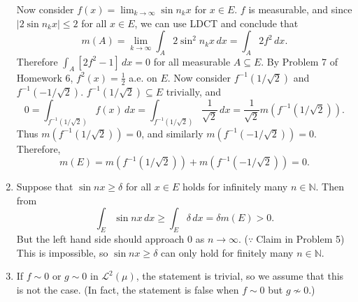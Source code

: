 \documentclass[12pt]{report}
\newcommand{\numl}[1]{\item[\large\textbf{\sffamily #1.}]}
\newcommand{\mc}[1]{\mathcal{#1}}
\newcommand{\inv}{^{-1}}
\renewcommand{\subset}{\subseteq}
\newcommand{\abs}[1]{\left| #1 \right|}
\newcommand{\ra}{\rightarrow}
\newcommand{\N}{\mathbb{N}}
\renewcommand{\d}[1]{\,d{#1}}
\begin{document}
\begin{enumerate}
    Now consider \(f(x) = \lim_{k \ra \infty} \sin n_k x\) for \(x \in E\). \(f\) is measurable, and since \(\abs{2\sin n_k x} \leq 2\) for all \(x \in E\), we can use LDCT and conclude that
    \[
        m(A) = \lim_{k \ra \infty} \int_A 2\sin^2 n_k x\d{x} = \int_A 2f^2\d{x}.
    \]
    Therefore \(\int_A \left[2f^2 - 1\right] \d{x} = 0\) for all measurable \(A \subset E\). By {\sffamily Problem 7} of {\sffamily Homework 6}, \(f^2(x) = \frac{1}{2}\) a.e. on \(E\). Now consider \(f\inv(1/\sqrt{2})\) and \(f\inv(-1/\sqrt{2})\). \(f\inv(1/\sqrt{2}) \subset E\) trivially, and
    \[
        0 = \int_{f\inv(1/\sqrt{2})} f(x) \d{x} =\int_{f\inv(1/\sqrt{2})} \frac{1}{\sqrt{2}} \d{x} = \frac{1}{\sqrt{2}} m(f\inv(1/\sqrt{2})).
    \]
    Thus \(m(f\inv(1/\sqrt{2})) = 0\), and similarly \(m(f\inv(-1/\sqrt{2})) = 0\). Therefore, \[m(E) = m(f\inv(1/\sqrt{2})) + m(f\inv(-1/\sqrt{2})) = 0.\]

    \numl{6} Suppose that \(\sin nx \geq \delta\) for all \(x \in E\) holds for infinitely many \(n \in \N\). Then from
    \[
        \int_E \sin nx \d{x} \geq \int_E \delta \d{x} = \delta m(E) > 0.
    \]
    But the left hand side should approach 0 as \(n \ra \infty\). (\(\because\;\){\sffamily Claim} in {\sffamily Problem 5}) This is impossible, so \(\sin nx \geq \delta\) can only hold for finitely many \(n \in \N\).

    \numl{7} If \(f \sim 0\) or \(g \sim 0\) in \(\mc{L}^{2}(\mu)\), the statement is trivial, so we assume that this is not the case. (In fact, the statement is false when \(f \sim 0\) but \(g \not\sim 0\).)


\end{enumerate}
\end{document}
